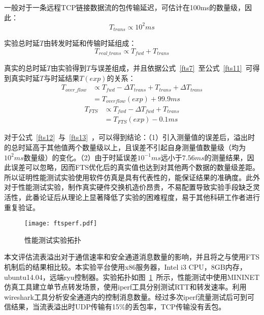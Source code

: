一般对于一条远程TCP链接数据流的包传输延迟，可估计在100ms的数量级，因此：
\begin{equation}\label{fts10}
T_{trans} \propto 10^{2}ms
\end{equation}

实验总时延$ T $由转发时延和传输时延组成：
\begin{equation}\label{fts11}
T_{real\_trans} \propto T_{fwd} + T_{trans}
\end{equation}

真实的总时延$T$由实验得到$T$与误差组成，并且依据公式~\ref{fts7}~至公式~\ref{fts11}~可得到真实时延$T$与时延结果$ T(exp) $的关系：
\begin{align}\label{fts12}
T_{over\_flow} &\propto T_{fwd} - \Delta T_{trans} + T_{trans} + \Delta T_{trans}  \nonumber \\
&=T_{overflow}(exp) + 99.9ms
\end{align}
\begin{align}\label{fts13}
T_{FTS} &\propto T_{fwd} - \Delta T_{fwd} + T_{trans} \nonumber \\
&=T_{FTS}(exp) - 0.1ms
\end{align}

对于公式~\ref{fts12}~与~\ref{fts13}~，可以得到结论：（1）引入测量值的误差后，溢出时的总时延高于其他值两个数量级以上，且误差不引起自身测量值数量级（均为$10^2ms$数量级）的变化。（2）由于时延误差$10^{-1}ms $远小于$ 7.56ms$的测量结果，因此误差可以忽略，因而FTS优化后的真实值也达到对其他两个数据的数量级差距。所以证明性能测试实验使用软件仿真是具有代表性的，能保证结果的准确度。此外对于性能测试实验，制作真实硬件交换机造价昂贵，不易配置导致实验手段缺乏灵活性，此番论证后从理论上显著降低了实验的困难程度，易于其他科研工作者进行重复验证。


\begin{figure}[!ht]
	\centering 
	\vspace{-1.5mm} 
	\texttt{[image: ftsperf.pdf]}
	\caption{性能测试实验拓扑} \label{fig:ftsperf}
\end{figure}

本文评估流表溢出对于通信速率和安全通道消息数量的影响，并且将之与使用FTS机制后的结果相比较。本实验平台使用x86服务器，Intel i3 CPU，8GB内存，ubuntu14.04，远端ryu控制器。实验拓扑如图~\ref{fig:ftsperf}~所示，性能测试中使用MININET仿真工具建立单节点转发场景，使用iperf工具分别测试RTT和转发速率。利用wireshark工具分析安全通道内的控制消息数量。经过多次iperf流量测试后可到可信结果，当流表溢出时UDP传输有15\%的丢包率，TCP传输没有丢包。

